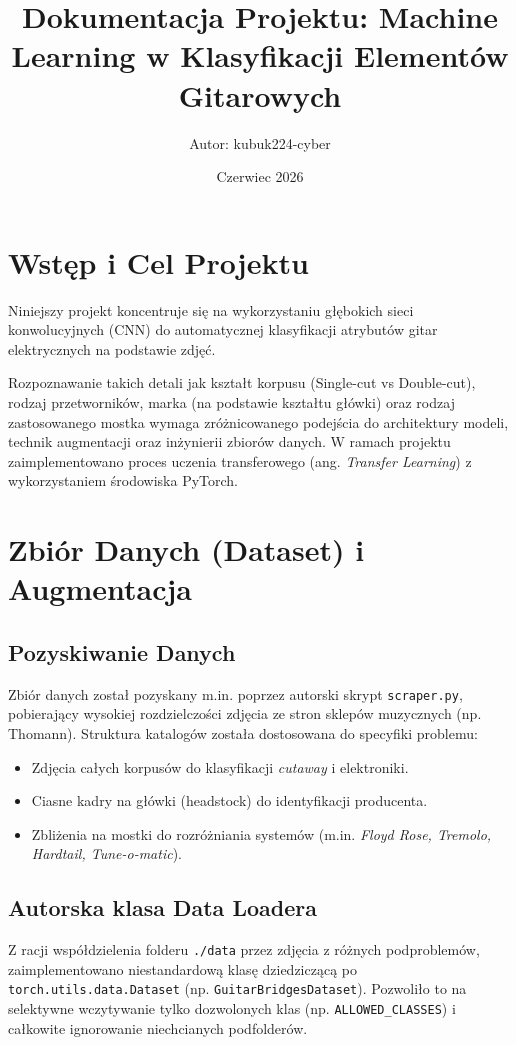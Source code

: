 \documentclass[12pt,a4paper]{article}
\title{\textbf{Dokumentacja Projektu: Machine Learning w Klasyfikacji Elementów Gitarowych}}
\author{Autor: kubuk224-cyber}
\date{Czerwiec 2026}
\begin{document}
\maketitle
\tableofcontents
\newpage

\section{Wstęp i Cel Projektu}
Niniejszy projekt koncentruje się na wykorzystaniu głębokich sieci konwolucyjnych (CNN) do automatycznej klasyfikacji atrybutów gitar elektrycznych na podstawie zdjęć. 

Rozpoznawanie takich detali jak kształt korpusu (Single-cut vs Double-cut), rodzaj przetworników, marka (na podstawie kształtu główki) oraz rodzaj zastosowanego mostka wymaga zróżnicowanego podejścia do architektury modeli, technik augmentacji oraz inżynierii zbiorów danych. W ramach projektu zaimplementowano proces uczenia transferowego (ang. \textit{Transfer Learning}) z wykorzystaniem środowiska PyTorch.

\section{Zbiór Danych (Dataset) i Augmentacja}

\subsection{Pozyskiwanie Danych}
Zbiór danych został pozyskany m.in. poprzez autorski skrypt \texttt{scraper.py}, pobierający wysokiej rozdzielczości zdjęcia ze stron sklepów muzycznych (np. Thomann). Struktura katalogów została dostosowana do specyfiki problemu:
\begin{itemize}
    \item Zdjęcia całych korpusów do klasyfikacji \textit{cutaway} i elektroniki.
    \item Ciasne kadry na główki (headstock) do identyfikacji producenta.
    \item Zbliżenia na mostki do rozróżniania systemów (m.in. \textit{Floyd Rose, Tremolo, Hardtail, Tune-o-matic}).
\end{itemize}

\subsection{Autorska klasa Data Loadera}
Z racji współdzielenia folderu \texttt{./data} przez zdjęcia z różnych podproblemów, zaimplementowano niestandardową klasę dziedziczącą po \texttt{torch.utils.data.Dataset} (np. \texttt{GuitarBridgesDataset}). Pozwoliło to na selektywne wczytywanie tylko dozwolonych klas (np. \texttt{ALLOWED\_CLASSES}) i całkowite ignorowanie niechcianych podfolderów.
\end{document}
